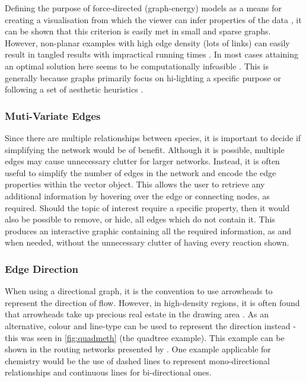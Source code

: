 Defining the purpose of force-directed (graph-energy) models as a means for creating a visualisation from which the viewer can infer properties of the data \citep{noack}, it can be shown that this criterion is easily met in small and sparse graphs. However, non-planar examples with high edge density (lots of links) can easily result in tangled results with impractical running times \citep{tvg}. In most cases attaining an optimal solution here seems to be computationally infeasible \citep{nicelyanneal}. This is generally because graphs primarily focus on hi-lighting a specific purpose or following a set of aesthetic heuristics \citep{eyetrack}.

\subsubsection{Muti-Variate Edges}
Since there are multiple relationships between species, it is important to decide if simplifying the network would be of benefit. Although it is possible, multiple edges may cause unnecessary clutter for larger networks. Instead, it is often useful to simplify the number of edges in the network and encode the edge properties within the vector object. This allows the user to retrieve any additional information by hovering over the edge or connecting nodes, as required. Should the topic of interest require a specific property, then it would also be possible to remove, or hide, all edges which do not contain it. This produces an interactive graphic containing all the required information, as and when needed, without the unnecessary clutter of having every reaction shown.
%
%





\subsubsection{Edge Direction}
When using a directional graph, it is the convention to use arrowheads to represent the direction of flow. However, in high-density regions, it is often found that arrowheads take up precious real estate in the drawing area \citep{noarredge}. As an alternative, colour and line-type can be used to represent the direction instead - this was seen in \autoref{fig:quadmeth} (the quadtree example). This example can be shown in the routing networks presented by \citep{networkrouting}. One example applicable for chemistry would be the use of dashed lines to represent mono-directional relationships and continuous lines for bi-directional ones.








